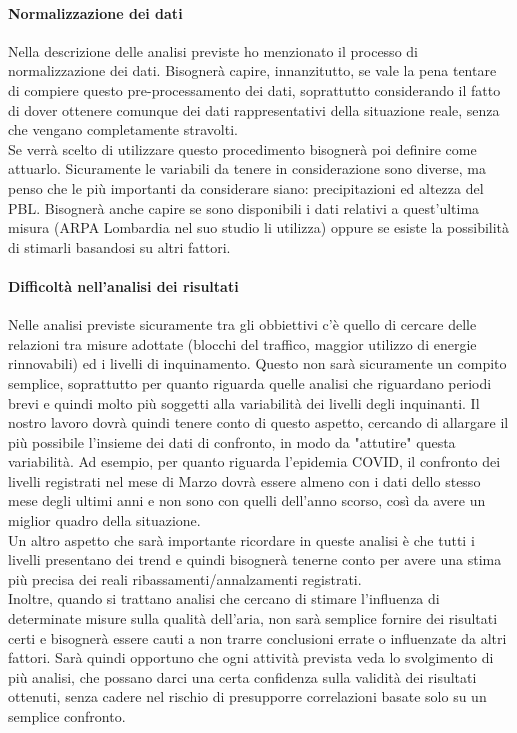 \documentclass{article}
\begin{document}
\paragraph{Normalizzazione dei dati}
Nella descrizione delle analisi previste ho menzionato il processo di normalizzazione dei dati. Bisognerà capire, innanzitutto, se vale la pena tentare di compiere questo pre-processamento dei dati, soprattutto considerando il fatto di dover ottenere comunque dei dati rappresentativi della situazione reale, senza che vengano completamente stravolti. 
\\Se verrà scelto di utilizzare questo procedimento bisognerà poi definire come attuarlo. Sicuramente le variabili da tenere in considerazione sono diverse, ma penso che le più importanti da considerare siano: precipitazioni ed altezza del PBL. Bisognerà anche capire se sono disponibili i dati relativi a quest'ultima misura (ARPA Lombardia nel suo studio\cite{arpaCovid} li utilizza) oppure se esiste la possibilità di stimarli basandosi su altri fattori.
\paragraph{Difficoltà nell'analisi dei risultati}
Nelle analisi previste sicuramente tra gli obbiettivi c'è quello di cercare delle relazioni tra misure adottate (blocchi del traffico, maggior utilizzo di energie rinnovabili) ed i livelli di inquinamento. Questo non sarà sicuramente un compito semplice, soprattutto per quanto riguarda quelle analisi che riguardano periodi brevi e quindi molto più soggetti alla variabilità dei livelli degli inquinanti. Il nostro lavoro dovrà quindi tenere conto di questo aspetto, cercando di allargare il più possibile l'insieme dei dati di confronto, in modo da "attutire" questa variabilità. Ad esempio, per quanto riguarda l'epidemia COVID, il confronto dei livelli registrati nel mese di Marzo dovrà essere almeno con i dati dello stesso mese degli ultimi anni e non sono con quelli dell'anno scorso, così da avere un miglior quadro della situazione.
\\Un altro aspetto che sarà importante ricordare in queste analisi è che tutti i livelli presentano dei trend e quindi bisognerà tenerne conto per avere una stima più precisa dei reali ribassamenti/annalzamenti registrati.
\\Inoltre, quando si trattano analisi che cercano di stimare l'influenza di determinate misure sulla qualità dell'aria, non sarà semplice fornire dei risultati certi e bisognerà essere cauti a non trarre conclusioni errate o influenzate da altri fattori. Sarà quindi opportuno che ogni attività prevista veda lo svolgimento di più analisi, che possano darci una certa confidenza sulla validità dei risultati ottenuti, senza cadere nel rischio di presupporre correlazioni basate solo su un semplice confronto.
\end{document}
